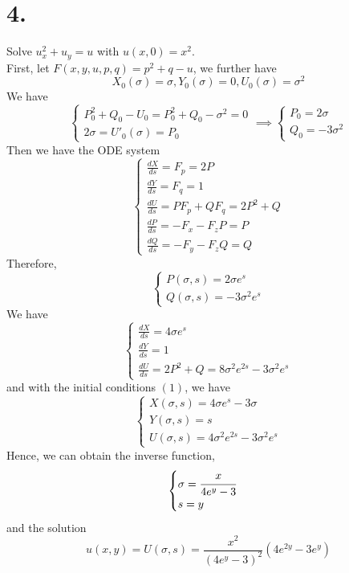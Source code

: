 \documentclass[11pt]{article}
\theoremstyle{mystyle}
\theoremstyle{definition}
\begin{document}
\section*{4.}
Solve $u_x^2 + u_y = u$ with $u(x,0) = x^2$. \\
First, let $F(x,y,u,p,q) = p^2 + q - u$, we further have
\begin{equation}
  X_0(\sigma) = \sigma, Y_0(\sigma) = 0, U_0(\sigma) = \sigma^2 
\end{equation}
We have
\[
  \begin{cases}
    P_0^2 + Q_0 - U_0 = P_0^2 + Q_0 - \sigma^2 = 0 \\
    2\sigma = U'_0(\sigma) = P_0
  \end{cases}
  \implies 
  \begin{cases}
    P_0 = 2\sigma \\
    Q_0 = -3\sigma^2  
  \end{cases}
\]
Then we have the ODE system 
\[
  \begin{cases}
    \displaystyle\frac{dX}{ds} = F_p = 2P \\
    \displaystyle\frac{dY}{ds} = F_q = 1 \\
    \displaystyle\frac{dU}{ds} = PF_p + QF_q = 2P^2 + Q \\
    \displaystyle\frac{dP}{ds} = -F_x - F_z P  =  P \\
    \displaystyle\frac{dQ}{ds} = -F_y - F_z Q = Q
  \end{cases}
\]
Therefore, 
\[
  \begin{cases}  
    P(\sigma, s) = 2\sigma e^s \\
    Q(\sigma, s) = -3 \sigma^2 e^s
  \end{cases}
\]
We have 
\[
  \begin{cases}
    \displaystyle\frac{dX}{ds} = 4 \sigma e^s \\ 
    \displaystyle\frac{dY}{ds} = 1 \\
    \displaystyle\frac{dU}{ds} = 2P^2 + Q = 8\sigma^2 e^{2s} - 3\sigma^2 e^s
  \end{cases}
\]
and with the initial conditions $(1)$, we have 
\[
  \begin{cases}
    X(\sigma,s)= 4 \sigma e^s - 3\sigma \\
    Y(\sigma, s)= s \\
    U(\sigma, s)= 4\sigma^2 e^{2s} - 3\sigma^2 e^s 
  \end{cases}
\]
Hence, we can obtain the inverse function, 
\[
  \begin{cases}
    \sigma = \cfrac{x}{4e^y - 3}\\
    s = y
  \end{cases}
\]
and the solution  
\[
  u(x,y) = U(\sigma, s) = \displaystyle\frac{x^2}{(4e^y-3)^2} (4e^{2y} - 3e^y) 
\]
\pagebreak
\end{document}
